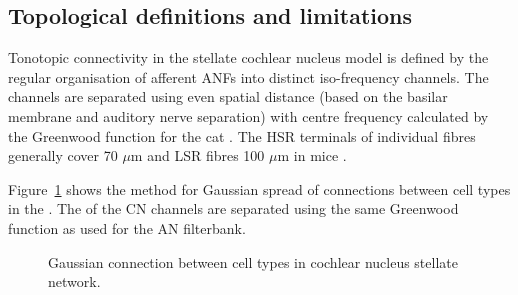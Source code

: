\subsection{Topological definitions and limitations    \label{sec:CN:tonot-conn}}

Tonotopic connectivity in the stellate cochlear nucleus model is defined by the regular organisation of afferent ANFs into distinct iso-frequency channels.
The channels are separated using even spatial distance (based on the basilar membrane and auditory nerve separation) with centre frequency calculated by the Greenwood function for the cat \citep[see~\ref{tab:ModelSummary},][]{Greenwood:1990}.
The HSR terminals of individual fibres generally cover 70 $\mu$m and LSR fibres 100 $\mu$m in mice \citep{OertelWuEtAl:1988,OertelWu:1989}.


Figure~\ref{fig:CNconn} shows the method for Gaussian spread of connections between cell types in the \CN\@.
The \CF of the CN channels are separated using the same Greenwood function as used for the AN filterbank.







\begin{figure}[htb]
  \begin{center}
    \caption{Gaussian connection between cell types in cochlear nucleus stellate network.}
    \label{fig:CNconn}
  \end{center}
\end{figure}

